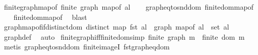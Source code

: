 \begin{isabellebody}
\endisatagproof
{\isafoldproof}%
%
\isadelimproof
\isanewline
%
\endisadelimproof
\isanewline
{}\isamarkupfalse%
\ finite{\isacharunderscore}{\kern0pt}graph{\isacharunderscore}{\kern0pt}map{\isacharunderscore}{\kern0pt}of{\isacharcolon}{\kern0pt}\ {\isachardoublequoteopen}finite\ {\isacharparenleft}{\kern0pt}graph\ {\isacharparenleft}{\kern0pt}map{\isacharunderscore}{\kern0pt}of\ al{\isacharparenright}{\kern0pt}{\isacharparenright}{\kern0pt}{\isachardoublequoteclose}\isanewline
%
\isadelimproof
\ \ %
\endisadelimproof
%
\isatagproof
{}\isamarkupfalse%
\ graph{\isacharunderscore}{\kern0pt}eq{\isacharunderscore}{\kern0pt}to{\isacharunderscore}{\kern0pt}snd{\isacharunderscore}{\kern0pt}dom\ finite{\isacharunderscore}{\kern0pt}dom{\isacharunderscore}{\kern0pt}map{\isacharunderscore}{\kern0pt}of\isanewline
\ \ \isamarkupfalse%
\ finite{\isacharunderscore}{\kern0pt}dom{\isacharunderscore}{\kern0pt}map{\isacharunderscore}{\kern0pt}of\ \isamarkupfalse%
\ blast%
\endisatagproof
{\isafoldproof}%
%
\isadelimproof
\isanewline
%
\endisadelimproof
\isanewline
{}\isamarkupfalse%
\ graph{\isacharunderscore}{\kern0pt}map{\isacharunderscore}{\kern0pt}of{\isacharunderscore}{\kern0pt}if{\isacharunderscore}{\kern0pt}distinct{\isacharunderscore}{\kern0pt}dom{\isacharcolon}{\kern0pt}\ {\isachardoublequoteopen}distinct\ {\isacharparenleft}{\kern0pt}map\ fst\ al{\isacharparenright}{\kern0pt}\ {\isasymLongrightarrow}\ graph\ {\isacharparenleft}{\kern0pt}map{\isacharunderscore}{\kern0pt}of\ al{\isacharparenright}{\kern0pt}\ {\isacharequal}{\kern0pt}\ set\ al{\isachardoublequoteclose}\isanewline
%
\isadelimproof
\ \ %
\endisadelimproof
%
\isatagproof
{}\isamarkupfalse%
\ graph{\isacharunderscore}{\kern0pt}def\ \isamarkupfalse%
\ auto%
\endisatagproof
{\isafoldproof}%
%
\isadelimproof
\isanewline
%
\endisadelimproof
\isanewline
{}\isamarkupfalse%
\ finite{\isacharunderscore}{\kern0pt}graph{\isacharunderscore}{\kern0pt}iff{\isacharunderscore}{\kern0pt}finite{\isacharunderscore}{\kern0pt}dom{\isacharbrackleft}{\kern0pt}simp{\isacharbrackright}{\kern0pt}{\isacharcolon}{\kern0pt}\ {\isachardoublequoteopen}finite\ {\isacharparenleft}{\kern0pt}graph\ m{\isacharparenright}{\kern0pt}\ {\isacharequal}{\kern0pt}\ finite\ {\isacharparenleft}{\kern0pt}dom\ m{\isacharparenright}{\kern0pt}{\isachardoublequoteclose}\isanewline
%
\isadelimproof
\ \ %
\endisadelimproof
%
\isatagproof
{}\isamarkupfalse%
\ {\isacharparenleft}{\kern0pt}metis\ graph{\isacharunderscore}{\kern0pt}eq{\isacharunderscore}{\kern0pt}to{\isacharunderscore}{\kern0pt}snd{\isacharunderscore}{\kern0pt}dom\ finite{\isacharunderscore}{\kern0pt}imageI\ fst{\isacharunderscore}{\kern0pt}graph{\isacharunderscore}{\kern0pt}eq{\isacharunderscore}{\kern0pt}dom{\isacharparenright}{\kern0pt}%

\end{isabellebody}
